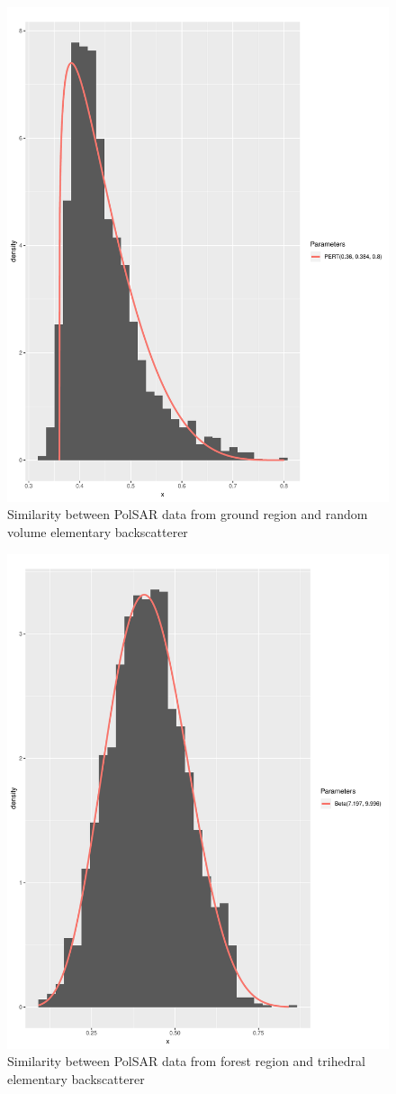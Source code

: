 \documentclass[conference]{IEEEtran}
\begin{document}
\begin{figure}[!ht]
    \centering
    \includegraphics[width = .9\linewidth, height = .7\linewidth]{../../../Figures/paper_19_05/rv_ground.pdf}
    \caption{Similarity between PolSAR data from ground region and random volume elementary backscatterer}
    \label{fig:gr_rv}
\end{figure}

\begin{figure}[!ht]
    \centering
    \includegraphics[width = .9\linewidth, height = .7\linewidth]{../../../Figures/paper_19_05/tr_vegetation.pdf}
    \caption{Similarity between PolSAR data from forest region and trihedral elementary backscatterer}
    \label{fig:fr_tr}
\end{figure}
\end{document}
